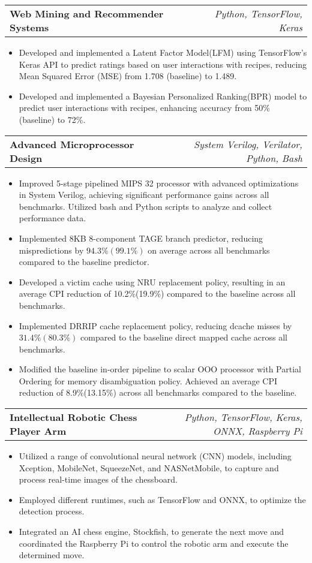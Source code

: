 \documentclass[letterpaper,11pt]{article}
\makeatletter
\newcommand{\resumeItem}[1]{
  \item\small{
    {#1 \vspace{-2pt}}
  }
}
\newcommand{\resumeProjectHeading}[2]{
    \vspace{-2pt}\item
    \begin{tabular*}{0.97\textwidth}{l@{\extracolsep{\fill}}r}
      \textcolor{secondary_color}{\textbf{#1}} & \textcolor{secondary_color}{\textit{\small #2}} \\
    \end{tabular*}\vspace{-7pt}
}
\newcommand{\resumeItemListStart}{\begin{itemize}}
\newcommand{\resumeItemListEnd}{\end{itemize}\vspace{-5pt}}
\makeatother
\begin{document}
      \resumeProjectHeading
      {\textbf{Web Mining and Recommender Systems}}{Python, TensorFlow, Keras}
        \resumeItemListStart
          \resumeItem{Developed and implemented a Latent Factor Model(LFM) using TensorFlow's Keras API to predict ratings based on user interactions with recipes, reducing Mean Squared Error (MSE) from 1.708 (baseline) to 1.489.}
          \resumeItem{Developed and implemented a Bayesian Personalized Ranking(BPR) model to predict user interactions with recipes, enhancing accuracy from 50\% (baseline) to 72\%.}
        \resumeItemListEnd

      \resumeProjectHeading
      {\textbf{Advanced Microprocessor Design}}{System Verilog, Verilator, Python, Bash}
        \resumeItemListStart
          \resumeItem{Improved 5-stage pipelined MIPS 32 processor with advanced optimizations in System Verilog, achieving significant performance gains across all benchmarks. Utilized bash and Python scripts to analyze and collect performance data.}
          \resumeItem{Implemented 8KB 8-component TAGE branch predictor, reducing mispredictions by \(94.3\%(99.1\%)\) on average across all benchmarks compared to the baseline predictor.}
          \resumeItem{Developed a victim cache using NRU replacement policy, resulting in an average CPI reduction of 10.2\%(19.9\%) compared to the baseline across all benchmarks.}
          \resumeItem{Implemented DRRIP cache replacement policy, reducing dcache misses by \(31.4\%(80.3\%)\) compared to the baseline direct mapped cache across all benchmarks.}
          \resumeItem{Modified the baseline in-order pipeline to scalar OOO processor with Partial Ordering for memory disambiguation policy. Achieved an average CPI reduction of 8.9\%(13.15\%) across all benchmarks compared to the baseline.}
        \resumeItemListEnd

      \resumeProjectHeading
        {\textbf{Intellectual Robotic Chess Player Arm}}{Python, TensorFlow, Keras, ONNX, Raspberry Pi}
          \resumeItemListStart
            \resumeItem{Utilized a range of convolutional neural network (CNN) models, including Xception, MobileNet, SqueezeNet, and NASNetMobile, to capture and process real-time images of the chessboard.}
            \resumeItem{Employed different runtimes, such as TensorFlow and ONNX, to optimize the detection process.}
            \resumeItem{Integrated an AI chess engine, Stockfish, to generate the next move and coordinated the Raspberry Pi to control the robotic arm and execute the determined move.}
          \resumeItemListEnd
\end{document}

